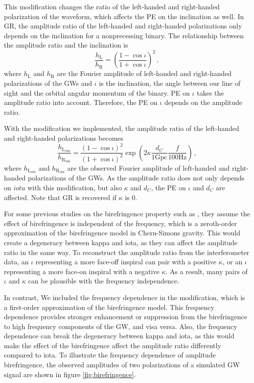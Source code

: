 \documentclass[reprint,amsmath,amssymb,aps,twocolumn]{aastex631}
\begin{document}
This modification changes the ratio of the left-handed and right-handed polarization of the waveform,
which affects the PE on the inclination as well.
In GR, the amplitude ratio of the left-handed and right-handed polarizations only depends on the inclination for a nonprecessing binary.
The relationship between the amplitude ratio and the inclination is
\begin{equation}
    \frac{h_\mathrm{L}}{h_\mathrm{R}}=\left(\frac{1-\cos\iota}{1+\cos\iota}\right)^2\,,
\end{equation}
where $h_\mathrm{L}$ and $h_\mathrm{R}$ are the Fourier amplitude of left-handed and right-handed polarizations of the GWs
and $\iota$ is the inclination, the angle between our line of sight and the orbital angular momentum of the binary.
PE on $\iota$ takes the amplitude ratio into account. Therefore, the PE on $\iota$ depends on the amplitude ratio.

With the modification we implemented, the amplitude ratio of the left-handed and right-handed polarizations becomes 
\begin{equation}
    \frac{h_\mathrm{L_{obs}}}{h_\mathrm{R_{obs}}}=\frac{\left(1-\cos\iota\right)^2}{\left(1+\cos\iota\right)^2}\exp\left({2\kappa\frac{d_C}{1\mathrm{Gpc}}\frac{f}{100\mathrm{Hz}}}\right)\,,
\end{equation}
where $h_\mathrm{L_{obs}}$ and $h_\mathrm{R_{obs}}$ are the observed Fourier amplitude of left-handed and right-handed polarizations of the GWs.
As the amplitude ratio does not only depends on $iota$ with this modification, but also $\kappa$ and $d_C$,
the PE on $\iota$ and $d_C$ are affected. Note that GR is recovered if $\kappa$ is $0$.

For some previous studies on the birefringence property such as \citet{Maria_2021}, they assume the effect of birefringence is independent of the frequency,
which is a zeroth-order approximation of the birefringence model in Chern-Simons gravity.
This would create a degeneracy between kappa and iota, as they can affect the amplitude ratio in the same way.
To reconstruct the amplitude ratio from the interferometer data, an $\iota$ representing a more face-off inspiral can pair with a positive $\kappa$,
or an $\iota$ representing a more face-on inspiral with a negative $\kappa$.
As a result, many pairs of $\iota$ and $\kappa$ can be plausible with the frequency independence.

In contrast, We included the frequency dependence in the modification, which is a first-order approximation of the birefringence model.
This frequency dependence provides stronger enhancement or suppression from the birefringence to high frequency components of the GW, and visa versa.
Also, the frequency dependence can break the degeneracy between kappa and iota,
as this would make the effect of the birefringence affect the amplitude ratio differently compared to iota.
To illustrate the frequency dependence of amplitude birefringence,
the observed amplitudes of two polarizations of a simulated GW signal are shown in figure \ref{fig:birefringence}.
\end{document}
